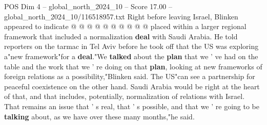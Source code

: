 \begin{textsample}{POS Dim 4 – global\_north\_2024\_10 – Score 17.00 – global\_north\_2024\_10/116518957.txt}
Right before leaving Israel, Blinken appeared to indicate @ @ @ @ @ @ @ @ @ @ placed within a larger regional framework that included a normalization \textbf{deal} with Saudi Arabia.
He told reporters on the tarmac in Tel Aviv before he took off that the US was exploring a"new framework"for a \textbf{deal}."We \textbf{talked} about the \textbf{plan} that we ' ve had on the table and the work that we ' re doing on that \textbf{plan}, looking at new frameworks of foreign relations as a possibility,"Blinken said.
The US"can see a partnership for peaceful coexistence on the other hand.
Saudi Arabia would be right at the heart of that, and that includes, potentially, normalization of relations with Israel.
That remains an issue that ' s real, that ' s possible, and that we ' re going to be \textbf{talking} about, as we have over these many months,"he said.

\end{textsample}
